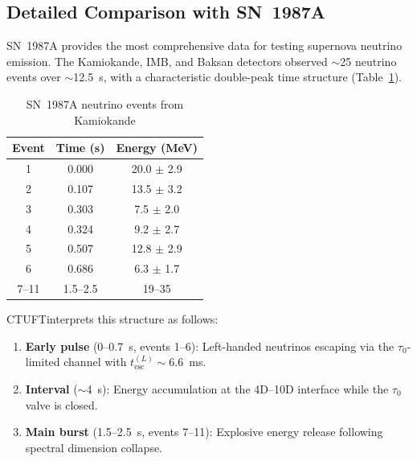 \documentclass[twocolumn, tightenlines, showpacs, showkeys, nofootinbib]{revtex4-1}
\newcommand{\ctuft}{\textsc{CTUFT}}
\newcommand{\tauzero}{\tau_0}
\begin{document}
\subsection{Detailed Comparison with SN~1987A}

SN~1987A provides the most comprehensive data for testing supernova 
neutrino emission. The Kamiokande, IMB, and Baksan detectors observed 
$\sim$25 neutrino events over $\sim$12.5~s, with a characteristic 
double-peak time structure (Table~\ref{tab:sn1987a_events}).

\begin{table}[t]
    \centering
    \caption{SN~1987A neutrino events from Kamiokande}
    \label{tab:sn1987a_events}
    \begin{tabular}{ccc}
        \toprule
        Event & Time (s) & Energy (MeV) \\
        \midrule
        1 & 0.000 & 20.0 $\pm$ 2.9 \\
        2 & 0.107 & 13.5 $\pm$ 3.2 \\
        3 & 0.303 & 7.5 $\pm$ 2.0 \\
        4 & 0.324 & 9.2 $\pm$ 2.7 \\
        5 & 0.507 & 12.8 $\pm$ 2.9 \\
        6 & 0.686 & 6.3 $\pm$ 1.7 \\
        7--11 & 1.5--2.5 & 19--35 \\
        \bottomrule
    \end{tabular}
\end{table}

\ctuft interprets this structure as follows:
\begin{enumerate}
    \item \textbf{Early pulse} (0--0.7~s, events 1--6): Left-handed neutrinos 
          escaping via the $\tauzero$-limited channel with $t_{\text{esc}}^{(L)} 
          \sim 6.6$~ms.
    \item \textbf{Interval} ($\sim$4~s): Energy accumulation at the 4D--10D 
          interface while the $\tauzero$ valve is closed.
    \item \textbf{Main burst} (1.5--2.5~s, events 7--11): Explosive energy 
          release following spectral dimension collapse.
\end{enumerate}
\end{document}
